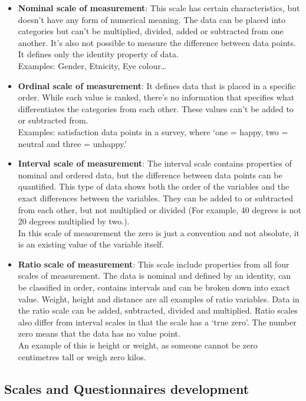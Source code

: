 \documentclass[
]{article}
\begin{document}
\begin{itemize}
\item
  \textbf{Nominal scale of measurement}: This scale has certain
  characteristics, but doesn't have any form of numerical meaning. The
  data can be placed into categories but can't be multiplied, divided,
  added or subtracted from one another. It's also not possible to
  measure the difference between data points. It defines only the
  identity property of data.\\
  Examples: Gender, Etnicity, Eye colour\ldots{}
\item
  \textbf{Ordinal scale of measurement}: It defines data that is placed
  in a specific order. While each value is ranked, there's no
  information that specifies what differentiates the categories from
  each other. These values can't be added to or subtracted from.\\
  Examples: satisfaction data points in a survey, where `one = happy,
  two = neutral and three = unhappy.'
\item
  \textbf{Interval scale of measurement}: The interval scale contains
  properties of nominal and ordered data, but the difference between
  data points can be quantified. This type of data shows both the order
  of the variables and the exact differences between the variables. They
  can be added to or subtracted from each other, but not multiplied or
  divided (For example, 40 degrees is not 20 degrees multiplied by
  two.).\\
  In this scale of measurement the zero is just a convention and not
  absolute, it is an existing value of the variable itself.
\item
  \textbf{Ratio scale of measurement}: This scale include properties
  from all four scales of measurement. The data is nominal and defined
  by an identity, can be classified in order, contains intervals and can
  be broken down into exact value. Weight, height and distance are all
  examples of ratio variables. Data in the ratio scale can be added,
  subtracted, divided and multiplied. Ratio scales also differ from
  interval scales in that the scale has a `true zero'. The number zero
  means that the data has no value point.\\
  An example of this is height or weight, as someone cannot be zero
  centimetres tall or weigh zero kilos.
\end{itemize}

\hypertarget{scales-and-questionnaires-development}{%
\subsection{Scales and Questionnaires
development}\label{scales-and-questionnaires-development}}
\end{document}
